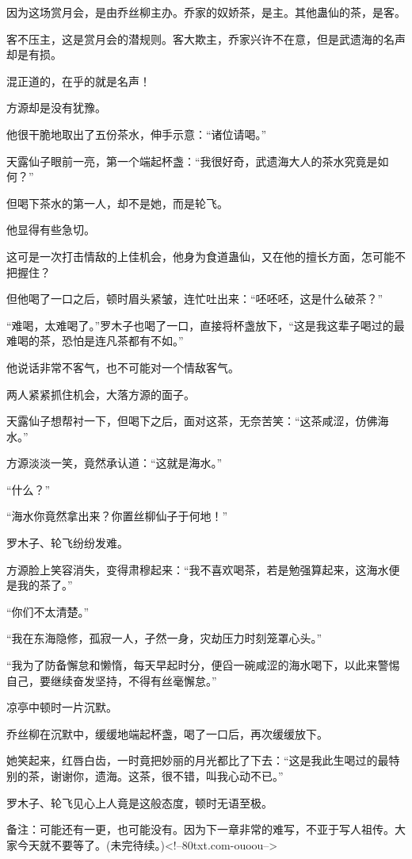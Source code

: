 \begin{this_body}
因为这场赏月会，是由乔丝柳主办。乔家的奴娇茶，是主。其他蛊仙的茶，是客。

客不压主，这是赏月会的潜规则。客大欺主，乔家兴许不在意，但是武遗海的名声却是有损。

混正道的，在乎的就是名声！

方源却是没有犹豫。

他很干脆地取出了五份茶水，伸手示意：“诸位请喝。”

天露仙子眼前一亮，第一个端起杯盏：“我很好奇，武遗海大人的茶水究竟是如何？”

但喝下茶水的第一人，却不是她，而是轮飞。

他显得有些急切。

这可是一次打击情敌的上佳机会，他身为食道蛊仙，又在他的擅长方面，怎可能不把握住？

但他喝了一口之后，顿时眉头紧皱，连忙吐出来：“呸呸呸，这是什么破茶？”

“难喝，太难喝了。”罗木子也喝了一口，直接将杯盏放下，“这是我这辈子喝过的最难喝的茶，恐怕是连凡茶都有不如。”

他说话非常不客气，也不可能对一个情敌客气。

两人紧紧抓住机会，大落方源的面子。

天露仙子想帮衬一下，但喝下之后，面对这茶，无奈苦笑：“这茶咸涩，仿佛海水。”

方源淡淡一笑，竟然承认道：“这就是海水。”

“什么？”

“海水你竟然拿出来？你置丝柳仙子于何地！”

罗木子、轮飞纷纷发难。

方源脸上笑容消失，变得肃穆起来：“我不喜欢喝茶，若是勉强算起来，这海水便是我的茶了。”

“你们不太清楚。”

“我在东海隐修，孤寂一人，孑然一身，灾劫压力时刻笼罩心头。”

“我为了防备懈怠和懒惰，每天早起时分，便舀一碗咸涩的海水喝下，以此来警惕自己，要继续奋发坚持，不得有丝毫懈怠。”

凉亭中顿时一片沉默。

乔丝柳在沉默中，缓缓地端起杯盏，喝了一口后，再次缓缓放下。

她笑起来，红唇白齿，一时竟把妙丽的月光都比了下去：“这是我此生喝过的最特别的茶，谢谢你，遗海。这茶，很不错，叫我心动不已。”

罗木子、轮飞见心上人竟是这般态度，顿时无语至极。

备注：可能还有一更，也可能没有。因为下一章非常的难写，不亚于写人祖传。大家今天就不要等了。(未完待续。)<!--80txt.com-ouoou-->

\end{this_body}

